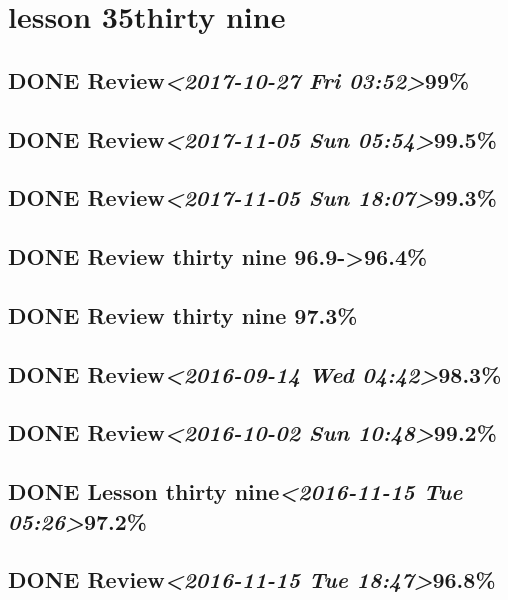 \documentclass[11pt]{ctexart}
\begin{document}
\section{lesson 35thirty nine}
\label{sec:org335ff56}
\subsection{{\bfseries\sffamily DONE} Review\textit{<2017-10-27 Fri 03:52>}99\%}
\label{sec:org85acedb}
\subsection{{\bfseries\sffamily DONE} Review\textit{<2017-11-05 Sun 05:54>}99.5\%}
\label{sec:org84f98e3}
\subsection{{\bfseries\sffamily DONE} Review\textit{<2017-11-05 Sun 18:07>}99.3\%}
\label{sec:orgc3f4854}
\subsection{{\bfseries\sffamily DONE} Review thirty nine 96.9->96.4\%}
\label{sec:org6c34372}
\subsection{{\bfseries\sffamily DONE} Review thirty nine 97.3\%}
\label{sec:org9d16c14}

\subsection{{\bfseries\sffamily DONE} Review\textit{<2016-09-14 Wed 04:42>}98.3\%}
\label{sec:orge1a74f2}
\subsection{{\bfseries\sffamily DONE} Review\textit{<2016-10-02 Sun 10:48>}99.2\%}
\label{sec:org2ce2ab3}
\subsection{{\bfseries\sffamily DONE} Lesson thirty nine\textit{<2016-11-15 Tue 05:26>}97.2\%}
\label{sec:orgddca61e}
\subsection{{\bfseries\sffamily DONE} Review\textit{<2016-11-15 Tue 18:47>}96.8\%}
\label{sec:orgd0c3f5d}
\end{document}
